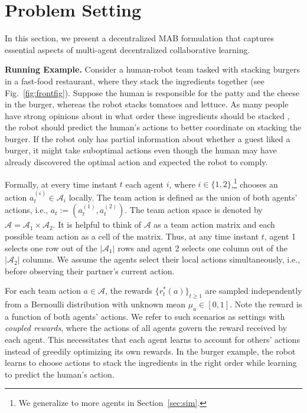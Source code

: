 \documentclass[letterpaper]{article} %
\theoremstyle{definition}
\def\mc{\mathcal}
\begin{document}
%




\section{Problem Setting}
\label{sec:problem}
In this section, we present a decentralized MAB formulation that captures essential aspects of multi-agent decentralized collaborative learning. 

\smallskip
\noindent\textbf{Running Example.} Consider a human-robot team tasked with stacking burgers in a fast-food restaurant, where they stack the ingredients together (see Fig.~\ref{fig:frontfig}). Suppose the human is responsible for the patty and the cheese in the burger, whereas the robot stacks tomatoes and lettuce. As many people have strong opinions about in what order these ingredients should be stacked \cite{burger_blog}, the robot should predict the human's actions to better coordinate on stacking the burger.
If the robot only has partial information about whether a guest liked a burger, it might take suboptimal actions even though the human may have already discovered the optimal action and expected the robot to comply.

Formally, at every time instant $t$ each agent $i$, where $i \in \{1,2\}$,\footnote{We generalize to more agents in Section~\ref{sec:sim}.} chooses an action $a^{(i)}_t \in \mc{A}_i$ locally. The team action is defined as the union of both agents' actions, i.e., $a_t := (a^{(1)}_t, a^{(2)}_t)$. The team action space is denoted by  $\mc{A} = \mc{A}_1 \times \mc{A}_2$. It is helpful to think of $\mc{A}$ as a team action matrix and each possible team action as a cell of the matrix. Thus, at any time instant $t$, agent 1 selects one row out of the $|\mc{A}_1|$ rows and agent 2 selects one column out of the $|\mc{A}_2|$ columns. We assume the agents select their local actions simultaneously, i.e., before observing their partner's current action.

For each team action $a \in \mc{A}$, the rewards $\{r^{\ast}_t(a)\}_{t\geq 1}$ are sampled independently from a Bernoulli distribution with unknown mean $\mu_a \in [0,1]$. Note the reward is a function of both agents' actions. We refer to such scenarios as settings with \emph{coupled rewards}, where the actions of all agents govern the reward received by each agent. This necessitates that each agent learns to account for others' actions instead of greedily optimizing its own rewards. In the burger example, the robot learns to choose actions to stack the ingredients in the right order while learning to predict the human's action. 
 
\end{document}
